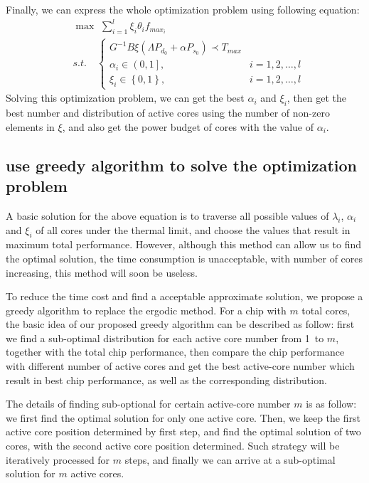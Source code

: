 Finally, we can express the whole optimization problem using following equation:
\begin{align*}
&\max\,\, \sum_{i=1}^l \xi_i \theta_i f_{max_i}\\
&s.t.\quad
\begin{cases}
G^{-1} B \xi \left( \Lambda P_{d_0}+ \alpha P_{s_0} \right) \prec T_{max}\\
\alpha_i \in \left(0,1\right], &i=1,2,\ldots,l  \\
\xi_i \in \left\{0,1\right\}, &i=1,2,\ldots,l
\end{cases}
\end{align*}
Solving this optimization problem, we can get the best $\alpha_i$ and $\xi_i$, then get the best number and distribution of active cores using the number of
non-zero elements in $\xi$, and also get the power budget of cores with the value of $\alpha_i$. 
\subsection{use greedy algorithm to solve the optimization problem}
A basic solution for the above equation is to traverse all possible values of $\lambda_i$, $\alpha_i$ and $\xi_i$ of all cores under the thermal limit,
and choose the values that result in maximum total performance. However, although this method can allow us to find the optimal solution, the time consumption
is unacceptable, with number of cores increasing, this method will soon be useless.

To reduce the time cost and find a acceptable approximate solution, we propose a greedy algorithm to replace the ergodic method.
For a chip with $m$ total cores, the basic idea of our proposed greedy algorithm can be described as follow: first we find a sub-optimal distribution for each active
core number from \SI{1} to $m$, together with the total chip performance, then compare the chip performance with different number of active cores and get
the best active-core number which result in best chip performance, as well as the corresponding distribution.

The details of finding sub-optional for certain active-core number $m$ is as follow: we first find the optimal solution for only one active core. Then, we keep
the first active core position determined by first step, and find the optimal solution of two cores, with the second active core position determined. Such strategy
will be iteratively processed for $m$ steps, and finally we can arrive at a sub-optimal solution for $m$ active cores.

